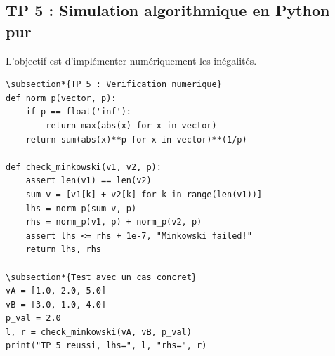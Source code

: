 \documentclass[11pt,a4paper]{article}
\begin{document}
\subsection*{TP 5 : Simulation algorithmique en Python pur}

L'objectif est d'implémenter numériquement les inégalités.

\begin{lstlisting}
\subsection*{TP 5 : Verification numerique}
def norm_p(vector, p):
    if p == float('inf'):
        return max(abs(x) for x in vector)
    return sum(abs(x)**p for x in vector)**(1/p)

def check_minkowski(v1, v2, p):
    assert len(v1) == len(v2)
    sum_v = [v1[k] + v2[k] for k in range(len(v1))]
    lhs = norm_p(sum_v, p)
    rhs = norm_p(v1, p) + norm_p(v2, p)
    assert lhs <= rhs + 1e-7, "Minkowski failed!"
    return lhs, rhs

\subsection*{Test avec un cas concret}
vA = [1.0, 2.0, 5.0]
vB = [3.0, 1.0, 4.0]
p_val = 2.0
l, r = check_minkowski(vA, vB, p_val)
print("TP 5 reussi, lhs=", l, "rhs=", r)
\end{lstlisting}
\end{document}
